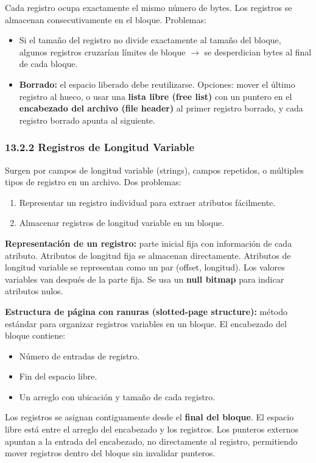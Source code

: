 \documentclass[11pt, a4paper]{article}
\begin{document}
Cada registro ocupa exactamente el mismo número de bytes. Los registros se almacenan consecutivamente en el bloque. Problemas:
\begin{itemize}[nosep]
	\item Si el tamaño del registro no divide exactamente al tamaño del bloque, algunos registros cruzarían límites de bloque $\rightarrow$ se desperdician bytes al final de cada bloque.
	\item \textbf{Borrado:} el espacio liberado debe reutilizarse. Opciones: mover el último registro al hueco, o usar una \textbf{lista libre (free list)} con un puntero en el \textbf{encabezado del archivo (file header)} al primer registro borrado, y cada registro borrado apunta al siguiente.
\end{itemize}

\subsubsection{13.2.2 Registros de Longitud Variable}

Surgen por campos de longitud variable (strings), campos repetidos, o múltiples tipos de registro en un archivo. Dos problemas:
\begin{enumerate}[nosep]
	\item Representar un registro individual para extraer atributos fácilmente.
	\item Almacenar registros de longitud variable en un bloque.
\end{enumerate}

\textbf{Representación de un registro:} parte inicial fija con información de cada atributo. Atributos de longitud fija se almacenan directamente. Atributos de longitud variable se representan como un par (offset, longitud). Los valores variables van después de la parte fija. Se usa un \textbf{null bitmap} para indicar atributos nulos.

\textbf{Estructura de página con ranuras (slotted-page structure):} método estándar para organizar registros variables en un bloque. El encabezado del bloque contiene:
\begin{itemize}[nosep]
	\item Número de entradas de registro.
	\item Fin del espacio libre.
	\item Un arreglo con ubicación y tamaño de cada registro.
\end{itemize}
Los registros se asignan contiguamente desde el \textbf{final del bloque}. El espacio libre está entre el arreglo del encabezado y los registros. Los punteros externos apuntan a la entrada del encabezado, no directamente al registro, permitiendo mover registros dentro del bloque sin invalidar punteros.
\end{document}
